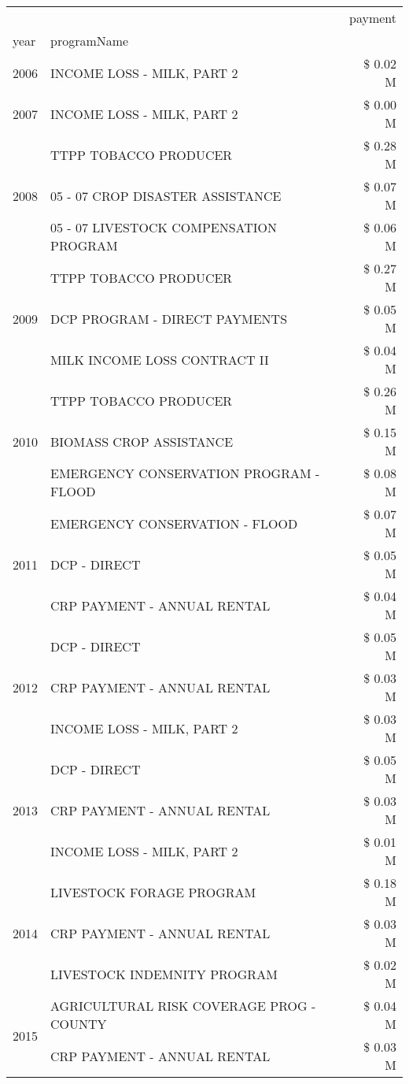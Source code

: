 \begin{tabular}{llr}
\toprule
 &  & payment \\
year & programName &  \\
\midrule
2006 & INCOME LOSS - MILK, PART 2 & \$ 0.02 M \\
\cline{1-3}
2007 & INCOME LOSS - MILK, PART 2 & \$ 0.00 M \\
\cline{1-3}
\multirow[t]{3}{*}{2008} & TTPP TOBACCO PRODUCER & \$ 0.28 M \\
 & 05 - 07 CROP DISASTER ASSISTANCE & \$ 0.07 M \\
 & 05 - 07 LIVESTOCK COMPENSATION PROGRAM & \$ 0.06 M \\
\cline{1-3}
\multirow[t]{3}{*}{2009} & TTPP TOBACCO PRODUCER & \$ 0.27 M \\
 & DCP PROGRAM - DIRECT PAYMENTS & \$ 0.05 M \\
 & MILK INCOME LOSS CONTRACT II & \$ 0.04 M \\
\cline{1-3}
\multirow[t]{3}{*}{2010} & TTPP TOBACCO PRODUCER & \$ 0.26 M \\
 & BIOMASS CROP ASSISTANCE & \$ 0.15 M \\
 & EMERGENCY CONSERVATION PROGRAM - FLOOD & \$ 0.08 M \\
\cline{1-3}
\multirow[t]{3}{*}{2011} & EMERGENCY CONSERVATION - FLOOD & \$ 0.07 M \\
 & DCP - DIRECT & \$ 0.05 M \\
 & CRP PAYMENT - ANNUAL RENTAL & \$ 0.04 M \\
\cline{1-3}
\multirow[t]{3}{*}{2012} & DCP - DIRECT & \$ 0.05 M \\
 & CRP PAYMENT - ANNUAL RENTAL & \$ 0.03 M \\
 & INCOME LOSS - MILK, PART 2 & \$ 0.03 M \\
\cline{1-3}
\multirow[t]{3}{*}{2013} & DCP - DIRECT & \$ 0.05 M \\
 & CRP PAYMENT - ANNUAL RENTAL & \$ 0.03 M \\
 & INCOME LOSS - MILK, PART 2 & \$ 0.01 M \\
\cline{1-3}
\multirow[t]{3}{*}{2014} & LIVESTOCK FORAGE PROGRAM & \$ 0.18 M \\
 & CRP PAYMENT - ANNUAL RENTAL & \$ 0.03 M \\
 & LIVESTOCK INDEMNITY PROGRAM & \$ 0.02 M \\
\cline{1-3}
\multirow[t]{3}{*}{2015} & AGRICULTURAL RISK COVERAGE PROG - COUNTY & \$ 0.04 M \\
 & CRP PAYMENT - ANNUAL RENTAL & \$ 0.03 M \\

\end{tabular}
